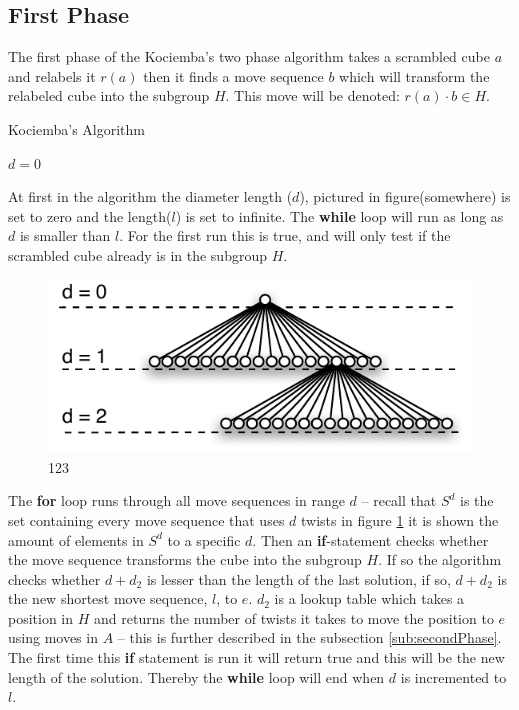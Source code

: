 \subsection{First Phase}
The first phase of the Kociemba's two phase algorithm takes a scrambled cube $a$ and relabels it $r(a)$ then it finds a move sequence $b$ which will transform the relabeled cube into the subgroup $H$. This move will be denoted: $r(a)\cdot{}b \in H$. 
\begin{algorithm}                     
\caption{Kociemba's Algorithm \cite{rokicki09}}          
\label{alg:kociemba}        
\begin{algorithmic}[1]
\STATE $d=0$
			\ENDIF
		\ENDIF
	\ENDFOR
\ENDWHILE
\end{algorithmic}
\end{algorithm}

At first in the algorithm the diameter length ($d$), pictured in figure(somewhere) is set to zero and the length($l$) is set to infinite. The \textbf{while} loop will run as long as $d$ is smaller than $l$. For the first run this is true, and will only test if the scrambled cube already is in the subgroup $H$.

\begin{figure}[hb]
	\centering
		\includegraphics{input/pics/searchExpansion.pdf}
	\caption{123}
	\label{fig:searchExpansion}
\end{figure}

The \textbf{for} loop runs through all move sequences in range $d$ -- recall that $S^d$ is the set containing every move sequence that uses $d$ twists in figure \ref{fig:searchExpansion} it is shown the amount of elements in $S^d$ to a specific $d$. Then an \textbf{if}-statement checks whether the move sequence transforms the cube into the subgroup $H$. If so the algorithm checks whether $d + d_2$ is lesser than the length of the last solution, if so, $d + d_2$ is the new shortest move sequence, $l$, to $e$. $d_2$ is a lookup table which takes a position in $H$ and returns the number of twists it takes to move the position to $e$ using moves in $A$ -- this is further described in the subsection \ref{sub:secondPhase}. The first time this \textbf{if} statement is run it will return true and this will be the new length of the solution. Thereby the \textbf{while} loop will end when $d$ is incremented to $l$.


